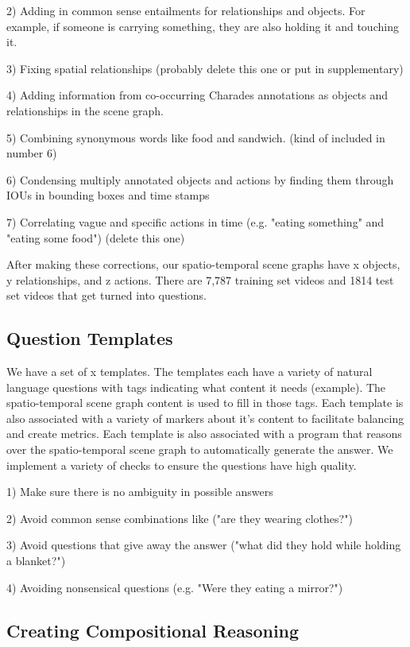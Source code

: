 \documentclass[10pt,twocolumn,letterpaper]{article}
\newcommand{\mgm}[1]{{\color{cyan}{mgm: #1}}}
\begin{document}
2) Adding in common sense entailments for relationships and objects. For example, if someone is carrying something, they are also holding it and touching it. 

3) Fixing spatial relationships (probably delete this one or put in supplementary)

4) Adding information from co-occurring Charades annotations as objects and relationships in the scene graph. 

5) Combining synonymous words like food and sandwich. (kind of included in number 6)

6) Condensing multiply annotated objects and actions by finding them through IOUs in bounding boxes and time stamps

7) Correlating vague and specific actions in time (e.g. "eating something" and "eating some food") (delete this one)


After making these corrections, our spatio-temporal scene graphs have x objects, y relationships, and z actions. There are 7,787 training set videos and 1814 test set videos that get turned into questions. 


\subsection{Question Templates}

We have a set of x templates. The templates each have a variety of natural language questions with tags indicating what content it needs (example). The spatio-temporal scene graph content is used to fill in those tags. Each template is also associated with a variety of markers about it's content to facilitate balancing and create metrics. Each template is also associated with a program that reasons over the spatio-temporal scene graph to automatically generate the answer. We implement a variety of checks to ensure the questions have high quality. 

\mgm{again, these could go to supplementary}

1) Make sure there is no ambiguity in possible answers

2) Avoid common sense combinations like ("are they wearing clothes?")

3) Avoid questions that give away the answer ("what did they hold while holding a blanket?")

4) Avoiding nonsensical questions (e.g. "Were they eating a mirror?")


\subsection{Creating Compositional Reasoning}
\end{document}

